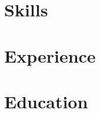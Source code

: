 \documentclass[letter,10pt]{article}
\begin{document}
\section{Skills}


\section{Experience}


\section{Education}



% 
\end{document}
